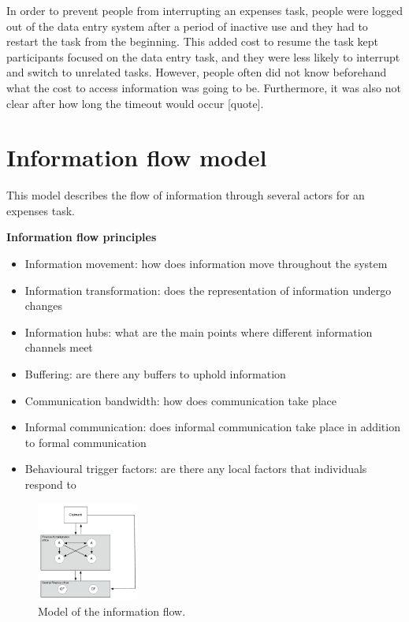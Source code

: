 In order to prevent people from interrupting an expenses task, people were logged out of the data entry system after a period of inactive use and they had to restart the task from the beginning. This added cost to resume the task kept participants focused on the data entry task, and they were less likely to interrupt and switch to unrelated tasks. However, people often did not know beforehand what the cost to access information was going to be. Furthermore, it was also not clear after how long the timeout would occur [quote].

\section{Information flow model}
This model describes the flow of information through several actors for an expenses task.

\begin{framed}\noindent
\textbf{Information flow principles}
\begin{itemize}
\item Information movement: how does information move throughout the system
\item Information transformation: does the representation of information undergo changes
\item Information hubs: what are the main points where different information channels meet
\item Buffering: are there any buffers to uphold information
\item Communication bandwidth: how does communication take place
\item Informal communication: does informal communication take place in addition to formal communication
\item Behavioural trigger factors: are there any local factors that individuals respond to
\end{itemize}
\end{framed}

\begin{figure}[!ht]
\centering
\includegraphics[width=0.3\textwidth]{images/ch12/ch12_infmodel.pdf}
\caption[Study 2 Information flow model]{Model of the information flow.}
\vspace{-9pt}
\label{fig:ch12_infmod}
\end{figure}


